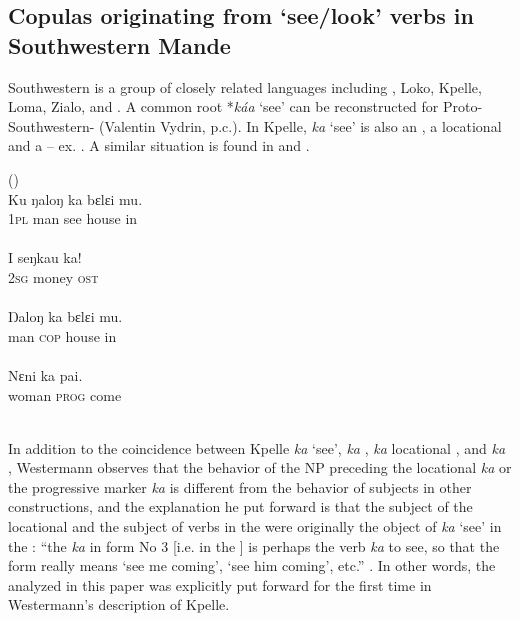 \documentclass[output=paper]{langsci/langscibook}
\begin{document}
\subsection{Copulas originating from ‘see\slash look’ verbs in Southwestern Mande}\label{sec:creissels:4.1}

Southwestern  is a group of closely related languages including , Loko, Kpelle, Loma, Zialo, and . A common root *\textit{káa} ‘see’ can be reconstructed for Proto-Southwestern- (Valentin Vydrin, p.c.). In Kpelle, \textit{ka} ‘see’ is also an  , a locational  and a  – ex. . A similar situation is found in  \citep{Sadler2006} and  \citep{Heydorn1940-1941}.

\ea%
    \label{ex:creissels:5}
    (\citealt[3, 10, 11, 12]{Westermann1930})\\

   \ea
    \gll   Ku  ŋaloŋ  ka  bɛlɛi  mu.\\
      \textsc{1pl}  man  see  house  in\\
      \\

   \ex
    \gll   I  seŋkau  ka!\\
      \textsc{2sg}  money  \textsc{ost}\\
      \\

   \ex
    \gll   Ŋaloŋ  ka  bɛlɛi  mu.\\
      man  \textsc{cop}  house  in\\
      \\

   \ex
    \gll   Nɛni  ka  pai.\\
      woman  \textsc{prog}  come\\
      \\
  \z
\z

In addition to the coincidence between Kpelle \textit{ka} ‘see’, \textit{ka}  , \textit{ka} locational , and \textit{ka} , Westermann observes that the behavior of the NP preceding the locational  \textit{ka} or the progressive marker \textit{ka} is different from the behavior of subjects in other  constructions, and the explanation he put forward is that the subject of the locational  and the subject of verbs in the  were originally the object of \textit{ka} ‘see’ in the : “the \textit{ka} in form No 3 [i.e. in the ] is perhaps the verb \textit{ka} to see, so that the form really means ‘see me coming’, ‘see him coming’, etc.” \citep[11]{Westermann1930}. In other words, the  analyzed in this paper was explicitly put forward for the first time in Westermann’s description of Kpelle.
\end{document}
